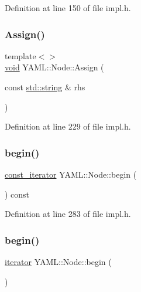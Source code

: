 Definition at line 150 of file impl.\+h.

\mbox{\label{class_y_a_m_l_1_1_node_aafad8b992bf145dfa4d03df519a41439}} 
\subsubsection{\texorpdfstring{Assign()}{Assign()}}
{\footnotesize\ttfamily template$<$$>$ \\
\mbox{\hyperlink{glad_8h_a950fc91edb4504f62f1c577bf4727c29}{void}} Y\+A\+M\+L\+::\+Node\+::\+Assign (\begin{DoxyParamCaption}\item[{const \mbox{\hyperlink{glad_8h_ac83513893df92266f79a515488701770}{std\+::string}} \&}]{rhs }\end{DoxyParamCaption})\hspace{0.3cm}{\ttfamily [inline]}}



Definition at line 229 of file impl.\+h.

\mbox{\label{class_y_a_m_l_1_1_node_abad00d4117dce1ce60e6c83963d74dd1}} 
\subsubsection{\texorpdfstring{begin()}{begin()}\hspace{0.1cm}{\footnotesize\ttfamily [1/2]}}
{\footnotesize\ttfamily \mbox{\hyperlink{class_y_a_m_l_1_1_node_a40d235ac56001961929189a33c923d6c}{const\+\_\+iterator}} Y\+A\+M\+L\+::\+Node\+::begin (\begin{DoxyParamCaption}{ }\end{DoxyParamCaption}) const\hspace{0.3cm}{\ttfamily [inline]}}



Definition at line 283 of file impl.\+h.

\mbox{\label{class_y_a_m_l_1_1_node_ac249a75c8d917a230c126ffd0585953a}} 
\subsubsection{\texorpdfstring{begin()}{begin()}\hspace{0.1cm}{\footnotesize\ttfamily [2/2]}}
{\footnotesize\ttfamily \mbox{\hyperlink{class_y_a_m_l_1_1_node_a3004302ddd5d977af0a6da29af38f7f4}{iterator}} Y\+A\+M\+L\+::\+Node\+::begin (\begin{DoxyParamCaption}{ }\end{DoxyParamCaption})\hspace{0.3cm}{\ttfamily [inline]}}



